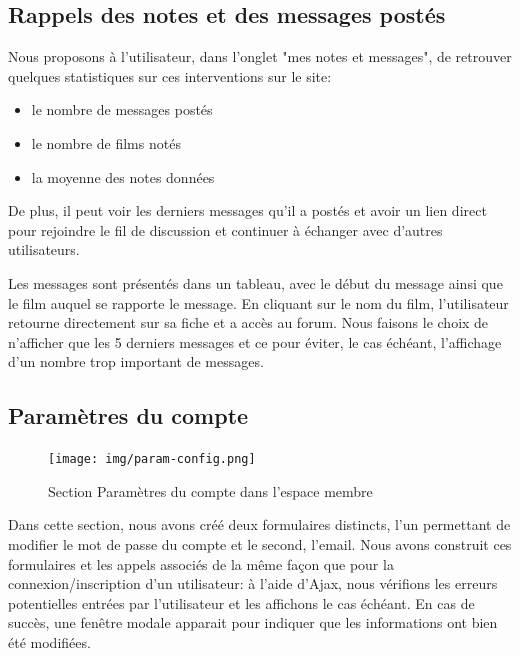         \subsection{Rappels des notes et des messages postés}


            Nous proposons à l'utilisateur, dans l'onglet "mes notes et messages", de retrouver quelques statistiques sur ces interventions sur le site:
            \begin{itemize}
                \item le nombre de messages postés
                \item le nombre de films notés
                \item la moyenne des notes données
            \end{itemize}

            De plus, il peut voir les derniers messages qu'il a postés et avoir un lien direct pour rejoindre le fil de discussion et continuer à échanger avec d'autres utilisateurs. 

            \smallskip
            Les messages sont présentés dans un tableau, avec le début du message ainsi que le film auquel se rapporte le message. En cliquant sur le nom du film, l'utilisateur retourne directement sur sa fiche et a accès au forum. Nous faisons le choix de n'afficher que les 5 derniers messages et ce pour éviter, le cas échéant, l'affichage d'un nombre trop important de messages.  


        \subsection{Paramètres du compte}

            \begin{figure}[!ht]
                \centering
                \texttt{[image: img/param-config.png]}
                \caption{Section Paramètres du compte dans l'espace membre}
            \end{figure}

            Dans cette section, nous avons créé deux formulaires distincts, l'un permettant de modifier le mot de passe du compte et le second, l'email. Nous avons construit ces formulaires et les appels associés de la même façon que pour la connexion/inscription d'un utilisateur: à l'aide d'Ajax, nous vérifions les erreurs potentielles entrées par l'utilisateur et les affichons le cas échéant. En cas de succès, une fenêtre modale apparait pour indiquer que les informations ont bien été modifiées.

